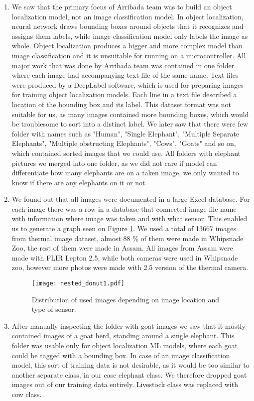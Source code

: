 \begin{enumerate}
    \item We saw that the primary focus of Arribada team was to build an object localization model, not an image classification model.
In object localization, neural network draws bounding boxes around objects that it recognizes and assigns them labels, while image classification model only labels the image as whole.
Object localization produces a bigger and more complex model than image classification and it is unsuitable for running on a microcontroller.
All major work that was done by Arribada team was contained in one folder where each image had accompanying text file of the same name.
Text files were produced by a DeepLabel software, which is used for preparing images for training object localization models.
Each line in a text file described a location of the bounding box and its label.
This dataset format was not suitable for us, as many images contained more bounding boxes, which would be troublesome to sort into a distinct label.
We later saw that there were few folder with names such as "Human", "Single Elephant", "Multiple Separate Elephants", "Multiple obstructing Elephants", "Cows", "Goats" and so on, which contained sorted images that we could use.
All folders with elephant pictures we merged into one folder, as we did not care if model can differentiate how many elephants are on a taken image, we only wanted to know if there are any elephants on it or not.

    \item We found out that all images were documented in a large Excel database.
For each image there was a row in a database that connected image file name with information where image was taken and with what sensor.
This enabled us to generate a graph seen on Figure \ref{nested_donut1}.
We used a total of 13667 images from thermal image dataset, almost 88 \% of them were made in Whipsnade Zoo, the rest of them were made in Assam.
All images from Assam were made with FLIR Lepton 2.5, while both cameras were used in Whipsnade zoo, however more photos were made with 2.5 version of the thermal camera.

\begin{figure}[ht]
    \centering
    \texttt{[image: nested\_donut1.pdf]} 
    \caption{Distribution of used images depending on image location and type of sensor.}
    \label{nested_donut1}
\end{figure}

    \item After manually inspecting the folder with goat images we saw that it mostly contained images of a goat herd, standing around a single elephant.
This folder was usable only for object localization ML models, where each goat could be tagged with a bounding box. 
In case of an image classification model, this sort of training data is not desirable, as it would be too similar to another separate class, in our case elephant class.
We therefore dropped goat images out of our training data entirely.
Livestock class was replaced with cow class.


\end{enumerate}
